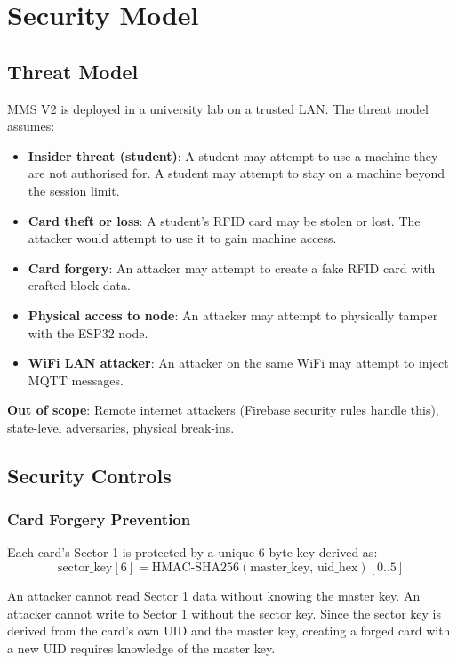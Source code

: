 \chapter{Security Model}
\label{ch:security}

\section{Threat Model}

MMS V2 is deployed in a university lab on a trusted LAN. The threat model assumes:

\begin{itemize}[leftmargin=1.5em]
    \item \textbf{Insider threat (student)}: A student may attempt to use a machine they are not authorised for. A student may attempt to stay on a machine beyond the session limit.
    \item \textbf{Card theft or loss}: A student's RFID card may be stolen or lost. The attacker would attempt to use it to gain machine access.
    \item \textbf{Card forgery}: An attacker may attempt to create a fake RFID card with crafted block data.
    \item \textbf{Physical access to node}: An attacker may attempt to physically tamper with the ESP32 node.
    \item \textbf{WiFi LAN attacker}: An attacker on the same WiFi may attempt to inject MQTT messages.
\end{itemize}

\textbf{Out of scope}: Remote internet attackers (Firebase security rules handle this), state-level adversaries, physical break-ins.

\section{Security Controls}

\subsection{Card Forgery Prevention}

Each card's Sector 1 is protected by a unique 6-byte key derived as:
\[
\text{sector\_key}[6] = \text{HMAC-SHA256}(\text{master\_key},\, \text{uid\_hex})[0..5]
\]

An attacker cannot read Sector 1 data without knowing the master key. An attacker cannot write to Sector 1 without the sector key. Since the sector key is derived from the card's own UID and the master key, creating a forged card with a new UID requires knowledge of the master key.

